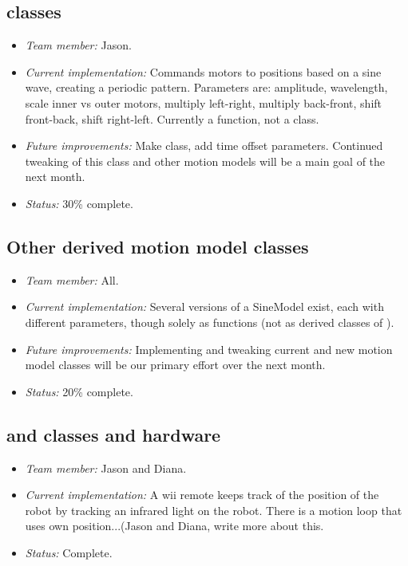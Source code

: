 \subsection*{ classes}

\begin{itemize}
\item \emph{Team member:} Jason.
\item \emph{Current implementation:} Commands motors to positions
  based on a sine wave, creating a periodic pattern. Parameters are:
  amplitude, wavelength, scale inner vs outer motors, multiply
  left-right, multiply back-front, shift front-back, shift right-left.
  Currently a function, not a class.
\item \emph{Future improvements:} Make class, add time offset
  parameters.  Continued tweaking of this class and other motion
  models will be a main goal of the next month.
\item \emph{Status:} 30\% complete.
\end{itemize}



\subsection*{Other derived motion model classes}

\begin{itemize}
\item \emph{Team member:} All.
\item \emph{Current implementation:} Several versions of a SineModel
  exist, each with different parameters, though solely as functions
  (not as derived classes of ).
\item \emph{Future improvements:} Implementing and tweaking current
  and new motion model classes will be our primary effort over the
  next month.
\item \emph{Status:} 20\% complete.
\end{itemize}



\subsection*{ and  classes
 and hardware}

\begin{itemize}
\item \emph{Team member:} Jason and Diana.
\item \emph{Current implementation:} A wii remote keeps track of the
position of the robot by tracking an infrared light on the robot. 
There is a motion loop that uses own position...(Jason and Diana, write
more about this.
\item \emph{Status:} Complete.
\end{itemize}



